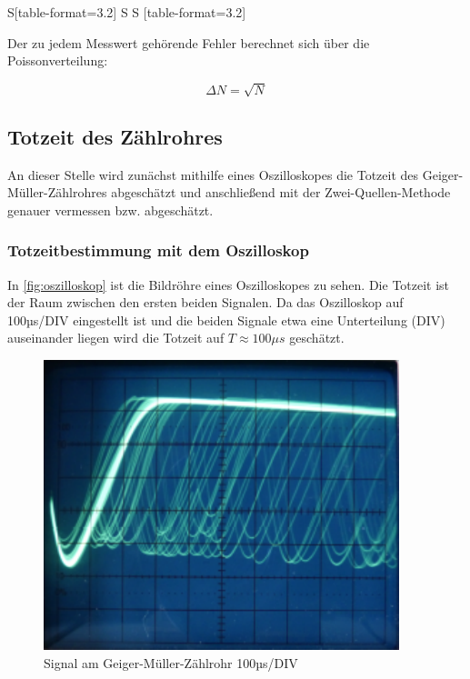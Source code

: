 \begin{table}
\begin{tabular}{S[table-format=3.2] S S   [table-format=3.2]}
  \end{tabular}
\end{table}
Der zu jedem Messwert gehörende Fehler berechnet sich über die Poissonverteilung:
\begin{center}
  \begin{equation}
      \label{eq:poisson}
      \Delta N=\sqrt{N}
      \end{equation}
\end{center}
\subsection{Totzeit des Zählrohres}
\label{sec:totzeit}
An dieser Stelle wird zunächst mithilfe eines Oszilloskopes die Totzeit des Geiger-Müller-Zählrohres
abgeschätzt und anschließend mit der Zwei-Quellen-Methode genauer vermessen bzw. abgeschätzt. 
\subsubsection{Totzeitbestimmung mit dem Oszilloskop}
\label{sec:totzeitO}
In \autoref{fig:oszilloskop} ist die Bildröhre eines Oszilloskopes zu sehen. Die Totzeit ist der Raum 
zwischen den ersten beiden Signalen. Da das Oszilloskop auf 100µs/DIV eingestellt ist und die beiden Signale 
etwa eine Unterteilung (DIV) auseinander liegen wird die Totzeit auf $T \approx 100\mu s$ geschätzt.
\begin{figure}
  \centering
  \includegraphics{oszilloskop.pdf}
  \caption{Signal am Geiger-Müller-Zählrohr 100µs/DIV}
  \label{fig:oszilloskop}
\end{figure}
